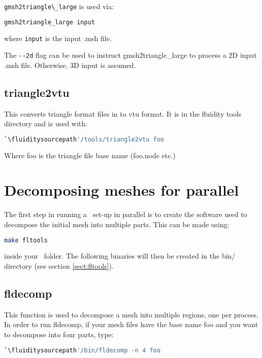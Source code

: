 \lstinline[language=Bash]{gmsh2triangle\_large} is used via:

\begin{lstlisting}[language = Bash]
gmsh2triangle_large input
\end{lstlisting}

where \lstinline[language = Bash]*input* is the input .msh file.

The \lstinline[language = Bash]+--2d+ flag can be used to instruct gmsh2triangle\_large
to process a 2D input .msh file. Otherwise, 3D input is assumed.

\subsection{triangle2vtu}
This converts triangle format files in to vtu format. It is in the fluidity tools directory and is used with:

\begin{lstlisting}[language = Bash]
`\fluiditysourcepath'/tools/triangle2vtu foo
\end{lstlisting}

Where foo is the triangle file base name (\ie foo.node etc.)

\section{Decomposing meshes for parallel}
\label{decomp_meshes_parallel}

The first step in running a \fluidity\ set-up in parallel is to create the software
used to decompose the initial mesh into multiple parts. This can be made using:
\begin{lstlisting}[language=bash]
make fltools
\end{lstlisting}
inside your \fluidity\ folder. The following binaries will then be created in the bin/ directory (see section \ref{sect:fltools}).

\subsection{fldecomp}
This function is used to decompose a mesh into multiple regions, one per process. In order to run fldecomp, if your mesh files have the base name foo and you want to decompose into four parts, type:
\begin{lstlisting}[language = Bash]
`\fluiditysourcepath'/bin/fldecomp -n 4 foo
\end{lstlisting}

